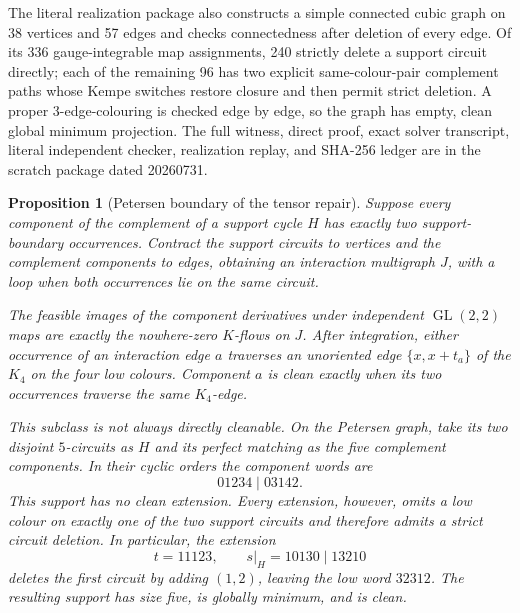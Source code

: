 \documentclass[11pt]{article}
\newtheorem{proposition}[theorem]{Proposition}
\theoremstyle{definition}
\theoremstyle{remark}
\begin{document}
The literal realization package also constructs a simple connected cubic
graph on 38 vertices and 57 edges and checks connectedness after deletion
of every edge.  Of its 336 gauge-integrable map assignments, 240 strictly
delete a support circuit directly; each of the remaining 96 has two
explicit same-colour-pair complement paths whose Kempe switches restore
closure and then permit strict deletion.  A proper 3-edge-colouring is
checked edge by edge, so the graph has empty, clean global minimum
projection.  The full witness, direct proof, exact solver transcript,
literal independent checker, realization replay, and SHA-256 ledger are
in the scratch package dated 20260731.

\begin{proposition}[Petersen boundary of the tensor repair]
\label{prop:petersentwooccurrence}
Suppose every component of the complement of a support cycle \(H\)
has exactly two support-boundary occurrences.  Contract the support
circuits to vertices and the complement components to edges, obtaining
an interaction multigraph \(J\), with a loop when both occurrences lie
on the same circuit.

The feasible images of the component derivatives under independent
\(\operatorname{GL}(2,2)\) maps are exactly the nowhere-zero \(K\)-flows
on \(J\).  After integration, either occurrence of an interaction edge
\(a\) traverses an unoriented edge \(\{x,x+t_a\}\) of the \(K_4\) on
the four low colours.  Component \(a\) is clean exactly when its two
occurrences traverse the same \(K_4\)-edge.

This subclass is not always directly cleanable.  On the Petersen graph,
take its two disjoint \(5\)-circuits as \(H\) and its perfect matching
as the five complement components.  In their cyclic orders the component
words are
\[
                         01234\mid03142.                \tag{26k}
\]
This support has no clean extension.  Every extension, however, omits a
low colour on exactly one of the two support circuits and therefore admits
a strict circuit deletion.  In particular, the extension
\[
       t=11123,\qquad s|_H=10130\mid13210
\]
deletes the first circuit by adding \((1,2)\), leaving the low word
\(32312\).  The resulting support has size five, is globally minimum,
and is clean.
\end{proposition}
\end{document}
